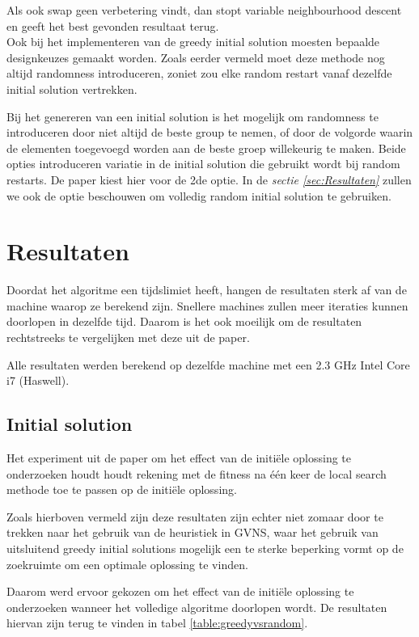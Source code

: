 \documentclass[pdftex,12pt,a4paper]{article}
\begin{document}
Als ook swap geen verbetering vindt, dan stopt variable neighbourhood descent en geeft het best gevonden resultaat terug.
\\[1em]
Ook bij het implementeren van de greedy initial solution moesten bepaalde designkeuzes gemaakt worden. Zoals eerder vermeld moet deze methode nog altijd randomness introduceren, zoniet zou elke random restart vanaf dezelfde initial solution vertrekken.
 
Bij het genereren van een initial solution is het mogelijk om randomness te introduceren door niet altijd de beste group te nemen, of door de volgorde waarin de elementen toegevoegd worden aan de beste groep willekeurig te maken. Beide opties introduceren variatie in de initial solution die gebruikt wordt bij random restarts. De paper kiest hier voor de 2de optie. In de \emph{sectie \ref{sec:Resultaten}} zullen we ook de optie beschouwen om volledig random initial solution te gebruiken.
 
\section{Resultaten \label{sec:Resultaten}}
Doordat het algoritme een tijdslimiet heeft, hangen de resultaten sterk af van de machine waarop ze berekend zijn. Snellere machines zullen meer iteraties kunnen doorlopen in dezelfde tijd. Daarom is het ook moeilijk om de resultaten rechtstreeks te vergelijken met deze uit de paper.

Alle resultaten werden berekend op dezelfde machine met een 2.3 GHz Intel Core i7 (Haswell).


\subsection{Initial solution}
Het experiment uit de paper om het effect van de initi\"ele oplossing te onderzoeken houdt houdt rekening met de fitness na \'e\'en keer de local search methode toe te passen op de initi\"ele oplossing.

Zoals hierboven vermeld zijn deze resultaten zijn echter niet zomaar door te trekken naar het gebruik van de heuristiek in GVNS, waar het gebruik van uitsluitend greedy initial solutions mogelijk een te sterke beperking vormt op de zoekruimte om een optimale oplossing te vinden.

Daarom werd ervoor gekozen om het effect van de initi\"ele oplossing te onderzoeken wanneer het volledige algoritme doorlopen wordt. De resultaten hiervan zijn terug te vinden in tabel \ref{table:greedyvsrandom}.
\end{document}
